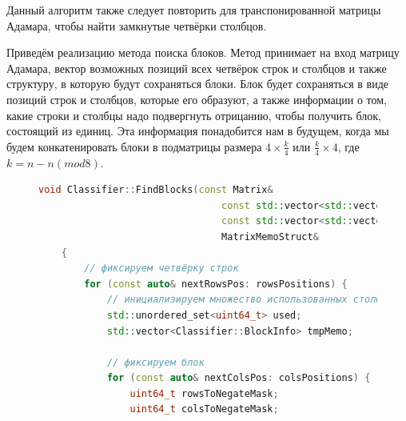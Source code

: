 Данный алгоритм также следует повторить для транспонированной матрицы Адамара, чтобы найти замкнутые четвёрки столбцов.

Приведём реализацию метода поиска блоков. Метод принимает на вход матрицу Адамара, вектор возможных позиций всех четвёрок строк и столбцов и также структуру, в которую будут сохраняться блоки. Блок будет сохраняться в виде позиций строк и столбцов, которые его образуют, а также информации о том, какие строки и столбцы надо подвергнуть отрицанию, чтобы получить блок, состоящий из единиц. Эта информация понадобится нам в будущем, когда мы будем конкатенировать блоки в подматрицы размера $4 \times \frac{k}{4}$ или $\frac{k}{4} \times 4$, где $k = n - n(mod8)$.
\begin{figure}[H]
    \centering
    \begin{minipage}{\linewidth}
    \begin{lstlisting}[language=c++, tabsize=4, showspaces=false, basicstyle=\fontsize{9.5}{11.5}\selectfont, numbers=none]
    void Classifier::FindBlocks(const Matrix&                             matrix,
                                const std::vector<std::vector<uint64_t>>& rowsPositions,
                                const std::vector<std::vector<uint64_t>>& colsPositions,
                                MatrixMemoStruct&                         memo) const
    {
        // фиксируем четвёрку строк
        for (const auto& nextRowsPos: rowsPositions) {
            // инициализируем множество использованных столбцов
            std::unordered_set<uint64_t> used;
            std::vector<Classifier::BlockInfo> tmpMemo;
    
            // фиксируем блок
            for (const auto& nextColsPos: colsPositions) {
                uint64_t rowsToNegateMask;
                uint64_t colsToNegateMask;
    

\end{lstlisting}
\end{minipage}
\end{figure}
